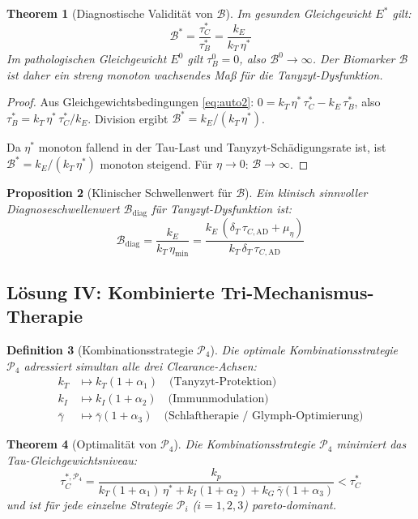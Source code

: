 ﻿\documentclass[12pt,a4paper]{article}
\newtheorem{theorem}{Theorem}[section]
\newtheorem{proposition}[theorem]{Proposition}
\newtheorem{definition}[theorem]{Definition}
\theoremstyle{definition}
\begin{document}
	\begin{theorem}[Diagnostische Validität von $\mathcal{B}$]
		\label{thm:biomarker}
		Im gesunden Gleichgewicht $E^*$ gilt:
		\[
		\mathcal{B}^* = \frac{\tau_C^*}{\tau_B^*} = \frac{k_E}{k_T\,\eta^*}
		\]
		Im pathologischen Gleichgewicht $E^0$ gilt $\tau_B^0 = 0$, also $\mathcal{B}^0 \to \infty$. Der Biomarker $\mathcal{B}$ ist daher ein streng monoton wachsendes Maß für die Tanyzyt-Dysfunktion.
	\end{theorem}
	
	\begin{proof}
		Aus Gleichgewichtsbedingungen \eqref{eq:auto2}: $0 = k_T\,\eta^*\,\tau_C^* - k_E\,\tau_B^*$, also $\tau_B^* = k_T\,\eta^*\,\tau_C^* / k_E$. Division ergibt $\mathcal{B}^* = k_E / (k_T\,\eta^*)$.
		
		Da $\eta^*$ monoton fallend in der Tau-Last und Tanyzyt-Schädigungsrate ist, ist $\mathcal{B}^* = k_E/(k_T\,\eta^*)$ monoton steigend. Für $\eta \to 0$: $\mathcal{B} \to \infty$.
	\end{proof}
	
	\begin{proposition}[Klinischer Schwellenwert für $\mathcal{B}$]
		Ein klinisch sinnvoller Diagnoseschwellenwert $\mathcal{B}_{\text{diag}}$ für Tanyzyt-Dysfunktion ist:
		\[
		\mathcal{B}_{\text{diag}} = \frac{k_E}{k_T\,\eta_{\min}} = \frac{k_E\,(\delta_T\,\tau_{C,\text{AD}} + \mu_\eta)}{k_T\,\delta_T\,\tau_{C,\text{AD}}}
		\]
	\end{proposition}
	
	\subsection{Lösung IV: Kombinierte Tri-Mechanismus-Therapie}
	
	\begin{definition}[Kombinationsstrategie $\mathcal{P}_4$]
		Die optimale Kombinationsstrategie $\mathcal{P}_4$ adressiert simultan alle drei Clearance-Achsen:
		\begin{align*}
			k_T &\mapsto k_T(1+\alpha_1)\quad \text{(Tanyzyt-Protektion)} \\
			k_I &\mapsto k_I(1+\alpha_2)\quad \text{(Immunmodulation)} \\
			\bar{\gamma} &\mapsto \bar{\gamma}(1+\alpha_3)\quad \text{(Schlaftherapie / Glymph-Optimierung)}
		\end{align*}
	\end{definition}
	
	\begin{theorem}[Optimalität von $\mathcal{P}_4$]
		\label{thm:optimality}
		Die Kombinationsstrategie $\mathcal{P}_4$ minimiert das Tau-Gleichgewichtsniveau:
		\[
		\tau_C^{*,\mathcal{P}_4} = \frac{k_p}{k_T(1+\alpha_1)\,\eta^* + k_I(1+\alpha_2) + k_G\,\bar{\gamma}(1+\alpha_3)} < \tau_C^*
		\]
		und ist für jede einzelne Strategie $\mathcal{P}_i$ ($i=1,2,3$) pareto-dominant.
	\end{theorem}
	
\end{document}
